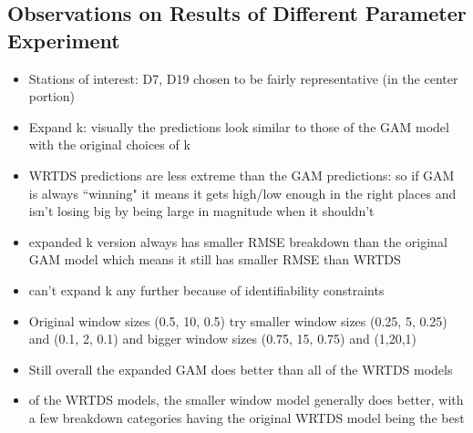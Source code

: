 \documentclass[12pt]{amsart}
\begin{document}
\subsection{Observations on Results of Different Parameter Experiment }
\begin{itemize}
\item Stations of interest: D7, D19 chosen to be fairly representative (in the center portion)
\item Expand k: visually the predictions look similar to those of the GAM model with the original choices of k
\item WRTDS predictions are less extreme than the GAM predictions: so if GAM is always ``winning" it means it gets high/low enough in the right places and isn't losing big by being large in magnitude when it shouldn't
\item expanded k version always has smaller RMSE breakdown than the original GAM model which means it still has smaller RMSE than WRTDS
\item can't expand k any further because of identifiability constraints
\item Original window sizes (0.5, 10, 0.5) try smaller window sizes (0.25, 5, 0.25) and (0.1, 2, 0.1) and bigger window sizes (0.75, 15, 0.75) and (1,20,1)
\item Still overall the expanded GAM does better than all of the WRTDS models
\item of the WRTDS models, the smaller window model generally does better, with a few breakdown categories having the original WRTDS model being the best
\end{itemize}
\end{document}
